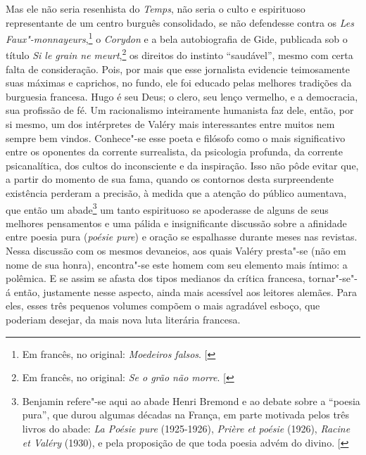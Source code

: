Mas ele não seria resenhista do \emph{Temps}, não seria o culto e
espirituoso representante de um centro burguês consolidado, se não
defendesse contra os \emph{Les Faux"-monnayeurs},\footnote{Em francês, no original: \emph{Moedeiros falsos}. {[}\versal{N. T.}{]}} o \emph{Corydon} e a bela
autobiografia de Gide, publicada sob o título \emph{Si le grain ne meurt},\footnote{Em francês, no original: \emph{Se o grão não
morre}. {[}\versal{N. T.}{]}} os direitos do instinto ``saudável'', mesmo com certa falta de
consideração. Pois, por mais que esse jornalista evidencie teimosamente
suas máximas e caprichos, no fundo, ele foi educado pelas melhores
tradições da burguesia francesa. Hugo é seu Deus; o clero, seu lenço
vermelho, e a democracia, sua profissão de fé. Um racionalismo
inteiramente humanista faz dele, então, por si mesmo, um dos intérpretes
de Valéry mais interessantes entre muitos nem sempre bem vindos.
Conhece"-se esse poeta e filósofo como o mais significativo entre os
oponentes da corrente surrealista, da psicologia profunda, da corrente
psicanalítica, dos cultos do inconsciente e da inspiração. Isso não pôde
evitar que, a partir do momento de sua fama, quando os contornos desta
surpreendente existência perderam a precisão, à medida que a atenção do
público aumentava, que então um abade\footnote{Benjamin refere"-se aqui
  ao abade Henri Bremond e ao debate sobre a ``poesia pura'', que durou
  algumas décadas na França, em parte motivada pelos três livros do
  abade: \emph{La Poésie pure} (1925-1926), \emph{Prière et poésie}
  (1926), \emph{Racine et Valéry} (1930), e pela proposição de que toda
  poesia advém do divino. {[}\versal{N. E.}{]}} um tanto espirituoso se
apoderasse de alguns de seus melhores pensamentos e uma pálida e
insignificante discussão sobre a afinidade entre poesia pura
(\emph{poésie pure}) e oração se espalhasse durante meses nas revistas.
Nessa discussão com os mesmos devaneios, aos quais Valéry presta"-se (não
em nome de sua honra), encontra"-se este homem com seu elemento mais íntimo: a
polêmica. E se assim se afasta dos tipos medianos da crítica francesa,
tornar"-se"-á então, justamente nesse aspecto, ainda mais acessível aos
leitores alemães. Para eles, esses três pequenos volumes compõem o mais
agradável esboço, que poderiam desejar, da mais nova luta literária
francesa.
